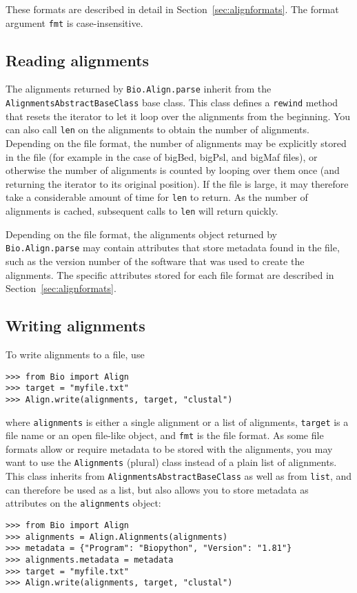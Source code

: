 These formats are described in detail in Section~\ref{sec:alignformats}. The format argument \verb|fmt| is case-insensitive.

\subsection{Reading alignments}

The alignments returned by \verb|Bio.Align.parse| inherit from the \verb|AlignmentsAbstractBaseClass| base class. This class defines a \verb|rewind| method that resets the iterator to let it loop over the alignments from the beginning. You can also call \verb|len| on the alignments to obtain the number of alignments. Depending on the file format, the number of alignments may be explicitly stored in the file (for example in the case of bigBed, bigPsl, and bigMaf files), or otherwise the number of alignments is counted by looping over them once (and returning the iterator to its original position). If the file is large, it may therefore take a considerable amount of time for \verb|len| to return. As the number of alignments is cached, subsequent calls to \verb|len| will return quickly.

Depending on the file format, the alignments object returned by \verb|Bio.Align.parse| may contain attributes that store metadata found in the file, such as the version number of the software that was used to create the alignments. The specific attributes stored for each file format are described in Section~\ref{sec:alignformats}.

\subsection{Writing alignments}

To write alignments to a file, use
\begin{verbatim}
>>> from Bio import Align
>>> target = "myfile.txt"
>>> Align.write(alignments, target, "clustal")
\end{verbatim}
where \verb|alignments| is either a single alignment or a list of alignments, \verb|target| is a file name or an open file-like object, and \verb|fmt| is the file format. As some file formats allow or require metadata to be stored with the alignments, you may want to use the \verb|Alignments| (plural) class instead of a plain list of alignments. This class inherits from \verb|AlignmentsAbstractBaseClass| as well as from \verb|list|, and can therefore be used as a list, but also allows you to store metadata as attributes on the \verb|alignments| object:
\begin{verbatim}
>>> from Bio import Align
>>> alignments = Align.Alignments(alignments)
>>> metadata = {"Program": "Biopython", "Version": "1.81"}
>>> alignments.metadata = metadata
>>> target = "myfile.txt"
>>> Align.write(alignments, target, "clustal")
\end{verbatim}

